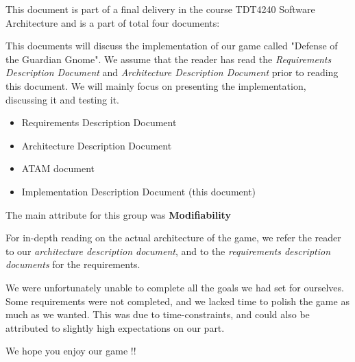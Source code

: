 This document is part of a final delivery in the course TDT4240 Software 
Architecture and is a part of total four documents:

This documents will discuss the implementation of our game called "Defense of 
the Guardian Gnome". We assume that the reader has read the \emph{Requirements 
Description Document} and \emph{Architecture Description Document} prior to 
reading this document. We will mainly focus on presenting the implementation, 
discussing it and testing it.

\begin{itemize}
	\item Requirements Description Document
	\item Architecture Description Document
	\item ATAM document
	\item Implementation Description Document (this document)
\end{itemize}

The main attribute for this group was \textbf{Modifiability}

For in-depth reading on the actual architecture of the game, we refer the
reader to our \emph{architecture description document}, and to the
\emph{requirements description documents} for the requirements. 

We were unfortunately unable to complete all the goals we had set for
ourselves. Some requirements were not completed, and we lacked time to
polish the game as much as we wanted. This was due to time-constraints,
and could also be attributed to slightly high expectations on our part.

We hope you enjoy our game !!